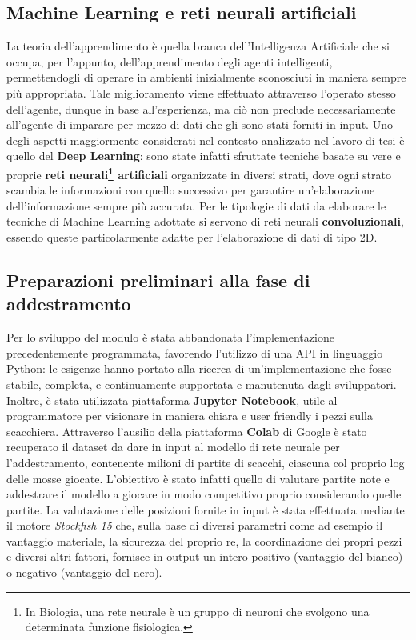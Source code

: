 \subsection{Machine Learning e reti neurali artificiali}
La teoria dell'apprendimento è quella branca dell'Intelligenza Artificiale che si occupa, per l'appunto, dell'apprendimento degli agenti intelligenti, permettendogli di operare in ambienti inizialmente sconosciuti in maniera sempre più appropriata. Tale miglioramento viene effettuato attraverso l'operato stesso dell'agente, dunque in base all'esperienza, ma ciò non preclude necessariamente all'agente di imparare per mezzo di dati che gli sono stati forniti in input.
Uno degli aspetti maggiormente considerati nel contesto analizzato nel lavoro di tesi è quello del \textbf{Deep Learning}: sono state infatti sfruttate tecniche basate su vere e proprie \textbf{reti neurali\footnote{In Biologia, una rete neurale è un gruppo di neuroni che svolgono una determinata funzione fisiologica.} artificiali} organizzate in diversi strati, dove ogni strato scambia le informazioni con quello successivo per garantire un'elaborazione dell'informazione sempre più accurata. Per le tipologie di dati da elaborare le tecniche di Machine Learning adottate si servono di reti neurali \textbf{convoluzionali}, essendo queste particolarmente adatte per l'elaborazione di dati di tipo 2D.

\subsection{Preparazioni preliminari alla fase di addestramento}
Per lo sviluppo del modulo è stata abbandonata l'implementazione precedentemente programmata, favorendo l'utilizzo di una API in linguaggio Python: le esigenze hanno portato alla ricerca di un'implementazione che fosse stabile, completa, e continuamente supportata e manutenuta dagli sviluppatori. Inoltre, è stata utilizzata piattaforma \textbf{Jupyter Notebook}, utile al programmatore per visionare in maniera chiara e user friendly i pezzi sulla scacchiera. Attraverso l'ausilio della piattaforma \textbf{Colab} di Google è stato recuperato il dataset da dare in input al modello di rete neurale per l'addestramento, contenente milioni di partite di scacchi, ciascuna col proprio log delle mosse giocate. L'obiettivo è stato infatti quello di valutare partite note e addestrare il modello a giocare in modo competitivo proprio considerando quelle partite. La valutazione delle posizioni fornite in input è stata effettuata mediante il motore \textit{Stockfish 15} che, sulla base di diversi parametri come ad esempio il vantaggio materiale, la sicurezza del proprio re, la coordinazione dei propri pezzi e diversi altri fattori, fornisce in output un intero positivo (vantaggio del bianco) o negativo (vantaggio del nero).\newpage

